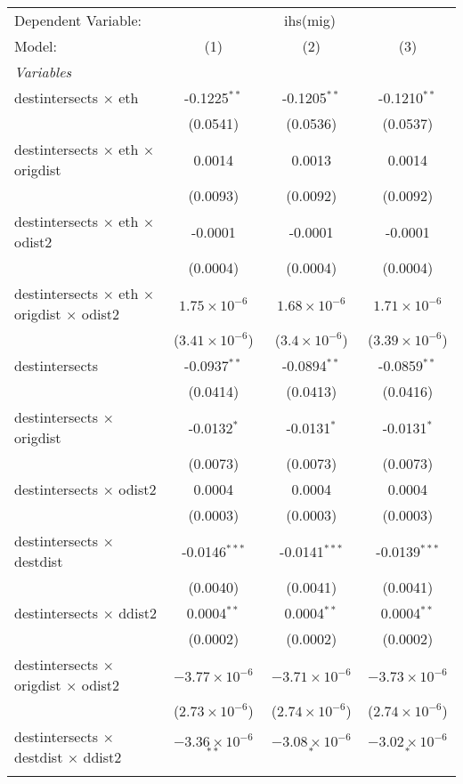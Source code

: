 \begin{tabular}{lccc}
\tabularnewline\midrule\midrule
Dependent Variable:&\multicolumn{3}{c}{ihs(mig)}\\
Model:&(1) & (2) & (3)\\
\midrule \emph{Variables}&   &   &  \\
destintersects $\times $ eth & -0.1225$^{**}$ & -0.1205$^{**}$ & -0.1210$^{**}$\\
  &(0.0541) & (0.0536) & (0.0537)\\
destintersects $\times $ eth $\times $ origdist & 0.0014 & 0.0013 & 0.0014\\
  &(0.0093) & (0.0092) & (0.0092)\\
destintersects $\times $ eth $\times $ odist2 & -0.0001 & -0.0001 & -0.0001\\
  &(0.0004) & (0.0004) & (0.0004)\\
destintersects $\times $ eth $\times $ origdist $\times $ odist2 & $1.75\times 10^{-6}$ & $1.68\times 10^{-6}$ & $1.71\times 10^{-6}$\\
  &($3.41\times 10^{-6}$) & ($3.4\times 10^{-6}$) & ($3.39\times 10^{-6}$)\\
destintersects & -0.0937$^{**}$ & -0.0894$^{**}$ & -0.0859$^{**}$\\
  &(0.0414) & (0.0413) & (0.0416)\\
destintersects $\times $ origdist & -0.0132$^{*}$ & -0.0131$^{*}$ & -0.0131$^{*}$\\
  &(0.0073) & (0.0073) & (0.0073)\\
destintersects $\times $ odist2 & 0.0004 & 0.0004 & 0.0004\\
  &(0.0003) & (0.0003) & (0.0003)\\
destintersects $\times $ destdist & -0.0146$^{***}$ & -0.0141$^{***}$ & -0.0139$^{***}$\\
  &(0.0040) & (0.0041) & (0.0041)\\
destintersects $\times $ ddist2 & 0.0004$^{**}$ & 0.0004$^{**}$ & 0.0004$^{**}$\\
  &(0.0002) & (0.0002) & (0.0002)\\
destintersects $\times $ origdist $\times $ odist2 & $-3.77\times 10^{-6}$ & $-3.71\times 10^{-6}$ & $-3.73\times 10^{-6}$\\
  &($2.73\times 10^{-6}$) & ($2.74\times 10^{-6}$) & ($2.74\times 10^{-6}$)\\
destintersects $\times $ destdist $\times $ ddist2 & $-3.36\times 10^{-6}$$^{**}$ & $-3.08\times 10^{-6}$$^{*}$ & $-3.02\times 10^{-6}$$^{*}$\\
$$
\end{tabular}
